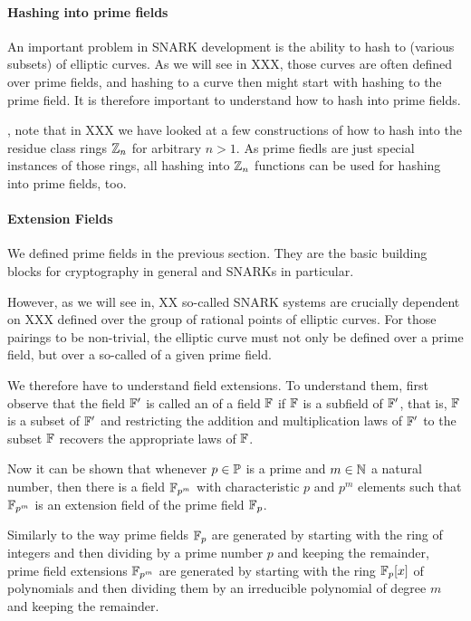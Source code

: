 \paragraph{Hashing into prime fields} 
An important problem in SNARK development is the ability to hash to (various subsets) of elliptic curves. As we will see in XXX, those curves are often defined over prime fields, and hashing to a curve then might start with hashing to the prime field. It is therefore important to understand how to hash into prime fields.

, note that in XXX we have looked at a few constructions of how to hash into the residue class rings $\mathbb{Z}_n$ for arbitrary $n>1$. As prime fiedls are just special instances of those rings, all hashing into $\mathbb{Z}_n$ functions can be used for hashing into prime fields, too.
\paragraph{Extension Fields}
We defined prime fields in the previous section. They are the basic building blocks for cryptography in general and SNARKs in particular.

However, as we will see in, XX so-called  SNARK systems are crucially dependent on  XXX defined over the group of rational points of elliptic curves. For those pairings to be non-trivial, the elliptic curve must not only be defined over a prime field, but over a so-called  of a given prime field.

We therefore have to understand field extensions. To understand them, first observe that the field $\mathbb{F}'$ is called an  of a field $\mathbb{F}$ if $\mathbb{F}$ is a subfield of $\mathbb{F}'$, that is, $\mathbb{F}$ is a subset of $\mathbb{F}'$ and restricting the addition and multiplication laws of $\mathbb{F}'$ to the subset $\mathbb{F}$ recovers the appropriate laws of $\mathbb{F}$.

Now it can be shown that whenever $p\in \mathbb{P}$ is a prime and $m\in\mathbb{N}$ a natural number, then there is a field $\mathbb{F}_{p^m}$ with characteristic $p$ and $p^m$ elements such that $\mathbb{F}_{p^m}$ is an extension field of the prime field $\mathbb{F}_p$.

Similarly to the way prime fields $\mathbb{F}_p$ are generated by starting with the ring of integers and then dividing by a prime number $p$ and keeping the remainder, prime field extensions $\mathbb{F}_{p^m}$ are generated by starting with the ring $\mathbb{F}_p[x]$ of polynomials and then dividing them by an irreducible polynomial of degree $m$ and keeping the remainder.

